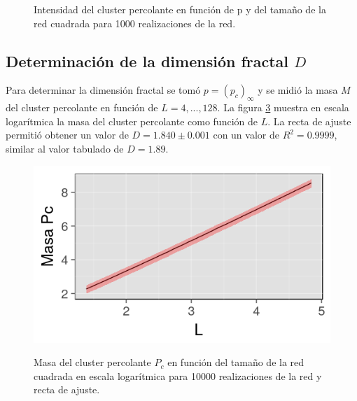\documentclass[%
 reprint,
 amsmath,amssymb,
 aps,
spanish]{revtex4-1}
\begin{document}
\begin{figure}[h]
\begin{subfigure}{.25\textwidth}
  \label{fig:2128x128}
\end{subfigure}
\caption{Intensidad del cluster percolante en función de p y del tamaño de la red cuadrada para 1000 realizaciones de la red.}
\label{fig:2}
\end{figure}


\subsection{\label{3} Determinaci\'on de la dimensi\'on fractal $D$ }
Para determinar la dimensión fractal se tomó $p=(p_c)_{\infty}$ y se midió la masa $M$ del cluster percolante en función de $L={4,...,128}$. La figura \ref{fig:3} muestra en escala logarítmica la masa del cluster percolante como función de $L$. La recta de ajuste permitió obtener un valor de $D=1.840\pm0.001$ con un valor de $R^2=0.9999$, similar al valor tabulado de $D=1.89$.
\begin{figure}[h]
  \centering
  \includegraphics[width=.9\linewidth]{ej3/masa}
  \label{fig:2masa}
\caption{Masa del cluster percolante $P_c$ en función del tamaño de la red cuadrada en escala logarítmica para 10000 realizaciones de la red y recta de ajuste.}
\label{fig:3}
\end{figure}
\end{document}
